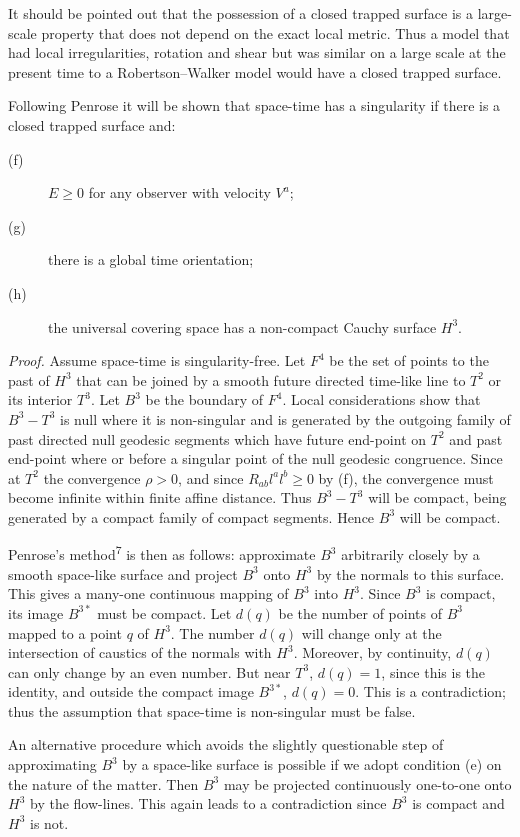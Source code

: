 It should be pointed out that the possession of a closed trapped surface is a
large-scale property that does not depend on the exact local metric. Thus a
model that had local irregularities, rotation and shear but was similar on a
large scale at the present time to a Robertson--Walker model would have a
closed trapped surface.

Following Penrose it will be shown that space-time has a singularity if there
is a closed trapped surface and:
\begin{description}
\item[(f)] $E\geq0$ for any observer with velocity $V^a$;
\item[(g)] there is a global time orientation;
\item[(h)] the universal covering space has a non-compact Cauchy surface
$H^3$.
\end{description}

\emph{Proof.} Assume space-time is singularity-free. Let $F^4$ be the set of
points to the past of $H^3$ that can be joined by a smooth future directed
time-like line to $T^2$ or its interior $T^3$. Let $B^3$ be the boundary of
$F^4$. Local considerations show that $B^3-T^3$ is null where it is
non-singular and is generated by the outgoing family of past directed null
geodesic segments which have future end-point on $T^2$ and past end-point
where or before a singular point of the null geodesic congruence. Since at
$T^2$ the convergence $\rho>0$, and since $R_{ab}l^al^b\geq0$ by (f), the
convergence must become infinite within finite affine distance. Thus
$B^3-T^3$ will be compact, being generated by a compact family of compact
segments. Hence $B^3$ will be compact.

Penrose's method\textsuperscript{7} is then as follows: approximate $B^3$
arbitrarily closely by a smooth space-like surface and project $B^3$ onto
$H^3$ by the normals to this surface. This gives a many-one continuous mapping
of $B^3$ into $H^3$. Since $B^3$ is compact, its image $B^{3*}$ must be
compact. Let $d(q)$ be the number of points of $B^3$ mapped to a point $q$ of
$H^3$. The number $d(q)$ will change only at the intersection of caustics of
the normals with $H^3$. Moreover, by continuity, $d(q)$ can only change by an
even number. But near $T^3$, $d(q)=1$, since this is the identity, and outside
the compact image $B^{3*}$, $d(q)=0$. This is a contradiction; thus the
assumption that space-time is non-singular must be false.

An alternative procedure which avoids the slightly questionable step of
approximating $B^3$ by a space-like surface is possible if we adopt condition
(e) on the nature of the matter. Then $B^3$ may be projected continuously
one-to-one onto $H^3$ by the flow-lines. This again leads to a contradiction
since $B^3$ is compact and $H^3$ is not.

